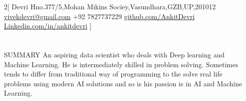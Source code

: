 \documentclass{my_cv}
\begin{document}
\begin{multicols}{2}[
        {Devri}%
        {Hno.377/5,Mohan Mikins Sociey,Vasundhara,GZB,UP,201012}%
        {\href{mailto:first.last@mail.com}{vivekdevri@gmail.com}}%
        {+92 7827737229}%
        {\href{https://github.com/AnkitDevri/}{github.com/AnkitDevri}}%
        {\href{https://www.linkedin.com/in/ankitdevri/}{Linkedin.com/in/ankitdevri}}%
        {}
]
\end{multicols}

\section{\faFileText}{SUMMARY}
An aspiring data scientist who deals with Deep learning and Machine Learning.
He is intermediately skilled in problem solving. Sometimes tends to differ from traditional way of programming to the solve real life problems using modern AI solutions and so is his passion is in AI and Machine Learning.
\end{document}
